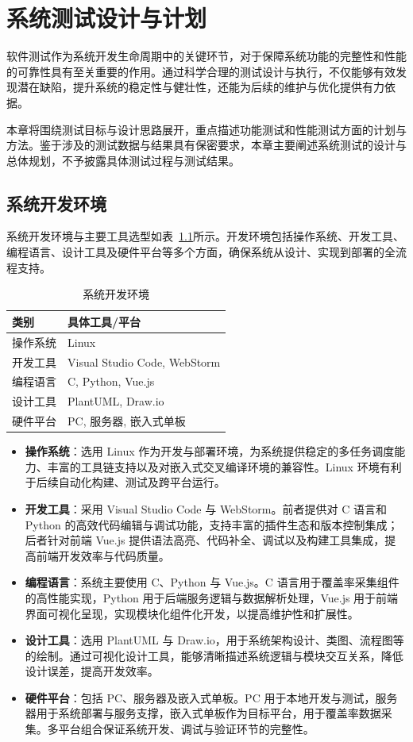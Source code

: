 
\chapter{系统测试设计与计划}
软件测试作为系统开发生命周期中的关键环节，对于保障系统功能的完整性和性能的可靠性具有至关重要的作用。通过科学合理的测试设计与执行，不仅能够有效发现潜在缺陷，提升系统的稳定性与健壮性，还能为后续的维护与优化提供有力依据。

本章将围绕测试目标与设计思路展开，重点描述功能测试和性能测试方面的计划与方法。鉴于涉及的测试数据与结果具有保密要求，本章主要阐述系统测试的设计与总体规划，不予披露具体测试过程与测试结果。

\section{系统开发环境}
系统开发环境与主要工具选型如表~\ref{tab:6.1}所示。开发环境包括操作系统、开发工具、编程语言、设计工具及硬件平台等多个方面，确保系统从设计、实现到部署的全流程支持。

\begin{table}[ht]
\centering
\caption{系统开发环境}
\label{tab:6.1}
    \begin{tabular}{ll}
        \toprule
        \textbf{类别} & \textbf{具体工具/平台} \\ 
        \midrule
        操作系统 & Linux  \\
        开发工具 & Visual Studio Code, WebStorm \\ 
        编程语言 & C, Python, Vue.js  \\ 
        设计工具 & PlantUML, Draw.io \\
        硬件平台 & PC, 服务器, 嵌入式单板 \\
        \bottomrule
    \end{tabular}
\end{table}

\begin{itemize}
\item \textbf{操作系统}：选用 Linux 作为开发与部署环境，为系统提供稳定的多任务调度能力、丰富的工具链支持以及对嵌入式交叉编译环境的兼容性。Linux 环境有利于后续自动化构建、测试及跨平台运行。
\item \textbf{开发工具}：采用 Visual Studio Code 与 WebStorm。前者提供对 C 语言和 Python 的高效代码编辑与调试功能，支持丰富的插件生态和版本控制集成；后者针对前端 Vue.js 提供语法高亮、代码补全、调试以及构建工具集成，提高前端开发效率与代码质量。
\item \textbf{编程语言}：系统主要使用 C、Python 与 Vue.js。C 语言用于覆盖率采集组件的高性能实现，Python 用于后端服务逻辑与数据解析处理，Vue.js 用于前端界面可视化呈现，实现模块化组件化开发，以提高维护性和扩展性。
\item \textbf{设计工具}：选用 PlantUML 与 Draw.io，用于系统架构设计、类图、流程图等的绘制。通过可视化设计工具，能够清晰描述系统逻辑与模块交互关系，降低设计误差，提高开发效率。
\item \textbf{硬件平台}：包括 PC、服务器及嵌入式单板。PC 用于本地开发与测试，服务器用于系统部署与服务支撑，嵌入式单板作为目标平台，用于覆盖率数据采集。多平台组合保证系统开发、调试与验证环节的完整性。
\end{itemize}

